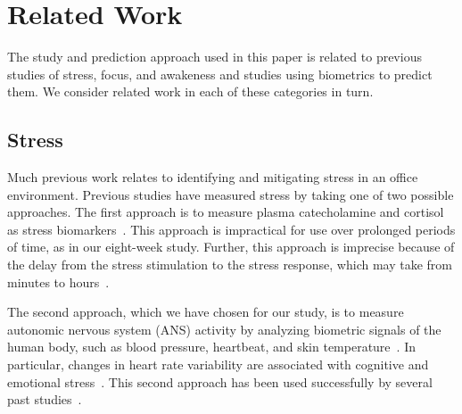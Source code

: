 \section{Related Work}


The study and prediction approach used in this paper is related
to previous studies of stress, focus, and awakeness and studies
using biometrics to predict them. We consider
related work in each of these categories in turn.



\subsection{Stress}
Much previous work relates to identifying and mitigating stress in an office environment.
Previous studies have measured stress by taking one of two possible approaches.
The first approach is to measure plasma catecholamine and cortisol as stress biomarkers~\cite{piazza10}.
This approach is impractical for use over prolonged periods of time, as in our eight-week study.
Further, this approach is imprecise because of the delay from the stress stimulation to the stress response, which may take from minutes to hours~\cite{Chandola10,Hellhammer09}.

The second approach, which we have chosen for our study, is to measure autonomic nervous system (ANS) activity by analyzing biometric signals of the human body, such as blood pressure, heartbeat, and skin temperature~\cite{kataoka00,Eekelen04,valentini10}.
In particular, changes in heart rate variability are associated with cognitive and emotional stress~\cite{mcduff16,dishman2000stress}.
This second approach has been used successfully by several past studies~\cite{Force96,gal07,montano09}.

